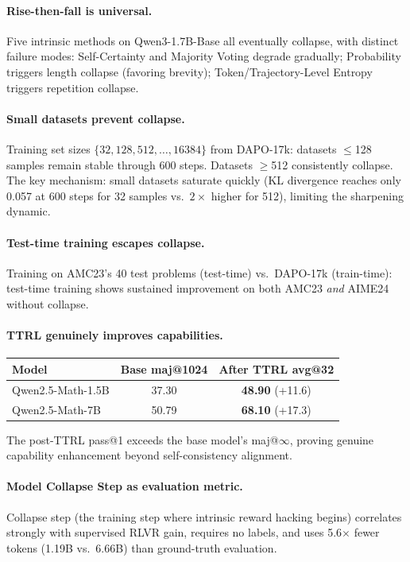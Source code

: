\documentclass[11pt]{article}
\begin{document}
\paragraph{Rise-then-fall is universal.} Five intrinsic methods on Qwen3-1.7B-Base all eventually collapse, with distinct failure modes: Self-Certainty and Majority Voting degrade gradually; Probability triggers length collapse (favoring brevity); Token/Trajectory-Level Entropy triggers repetition collapse.

\paragraph{Small datasets prevent collapse.} Training set sizes $\{32, 128, 512, \ldots, 16384\}$ from DAPO-17k: datasets $\leq$128 samples remain stable through 600 steps. Datasets $\geq$512 consistently collapse. The key mechanism: small datasets saturate quickly (KL divergence reaches only 0.057 at 600 steps for 32 samples vs.\ $2\times$ higher for 512), limiting the sharpening dynamic.

\paragraph{Test-time training escapes collapse.} Training on AMC23's 40 test problems (test-time) vs.\ DAPO-17k (train-time): test-time training shows sustained improvement on both AMC23 \emph{and} AIME24 without collapse.

\paragraph{TTRL genuinely improves capabilities.}
\begin{table}[h]
\centering
\begin{tabular}{lcc}
\toprule
\textbf{Model} & \textbf{Base maj@1024} & \textbf{After TTRL avg@32} \\
\midrule
Qwen2.5-Math-1.5B & 37.30 & \textbf{48.90} (+11.6) \\
Qwen2.5-Math-7B & 50.79 & \textbf{68.10} (+17.3) \\
\bottomrule
\end{tabular}
\end{table}
\noindent The post-TTRL pass@1 exceeds the base model's maj@$\infty$, proving genuine capability enhancement beyond self-consistency alignment.

\paragraph{Model Collapse Step as evaluation metric.} Collapse step (the training step where intrinsic reward hacking begins) correlates strongly with supervised RLVR gain, requires no labels, and uses 5.6$\times$ fewer tokens (1.19B vs.\ 6.66B) than ground-truth evaluation.
\end{document}
